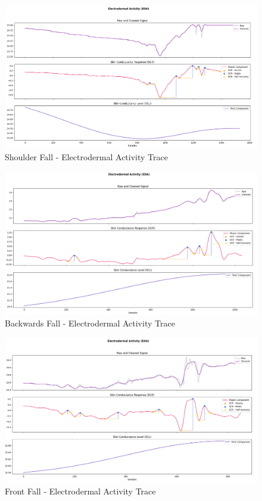 \begin{figure}[H]
    \centering
    \includegraphics[width=\textwidth]{./images/bitalino/Shoulder.png}
    \caption{Shoulder Fall - Electrodermal Activity Trace}
    \label{fig:bitalino-shoulder}
\end{figure}

\begin{figure}[H]
    \centering
    \includegraphics[width=\textwidth]{./images/bitalino/Backwards.png}
    \caption{Backwards Fall - Electrodermal Activity Trace}
    \label{fig:bitalino-backwards}
\end{figure}

\begin{figure}[H]
    \centering
    \includegraphics[width=\textwidth]{./images/bitalino/Front.png}
    \caption{Front Fall - Electrodermal Activity Trace}
    \label{fig:bitalino-front}
\end{figure}

